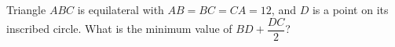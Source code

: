 Triangle $ABC$ is equilateral with $AB=BC=CA=12$, and $D$ is a point on its inscribed circle. What is the minimum value of $BD+\dfrac{DC}{2}$?

